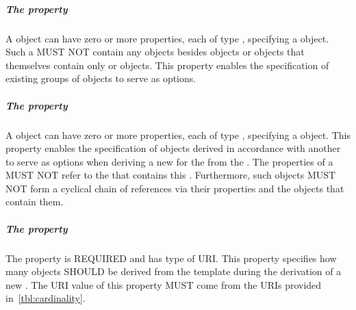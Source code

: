 \subparagraph{The  property}\label{sec:variantCollection}

A  object can have zero or more  properties, each of type , specifying a  object.
Such a  MUST NOT contain any objects besides  objects or  objects that themselves contain only  or  objects.
This property enables the specification of existing groups of  objects to serve as options.

\subparagraph{The  property}\label{sec:variantDerivation}

A  object can have zero or more  properties, each of type , specifying a  object. 
This property enables the specification of  objects derived in accordance with another  to serve as options when deriving a new  for the   from the . 
The  properties of a  MUST NOT refer to the  that contains this . 
Furthermore, such  objects MUST NOT form a cyclical chain of references via their  properties and the  objects that contain them. 

\subparagraph{The  property}\label{sec:cardinality}

The  property is REQUIRED and has type of URI. This property specifies how many  objects SHOULD be derived from the template  during the derivation of a new . The URI value of this property MUST come from the URIs provided in~\ref{tbl:cardinality}.

